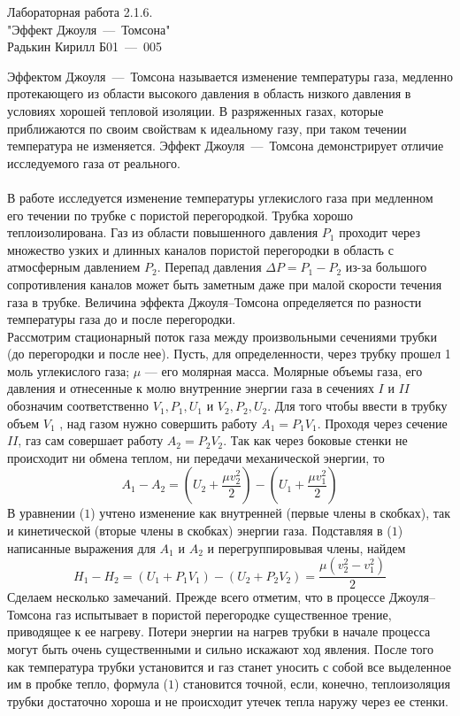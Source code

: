 \documentclass[12pt,a4paper]{article}
\begin{document}
    \begin{center}
        Лабораторная работа 2.1.6.
        \\
        "Эффект Джоуля~---~Томсона"
        \\
        Радькин Кирилл Б01~---~005
    \end{center}
    Эффектом Джоуля~---~Томсона называется изменение температуры газа, медленно протекающего из области высокого давления в область низкого давления в условиях хорошей тепловой изоляции. В разряженных газах, которые приближаются по своим свойствам к идеальному газу, при таком течении температура не изменяется. Эффект Джоуля~---~Томсона демонстрирует отличие исследуемого газа от реального.\\\\
    В работе исследуется изменение температуры углекислого газа при медленном его течении по трубке с пористой перегородкой. Трубка хорошо теплоизолирована. Газ из области повышенного давления $P_1$ проходит через множество узких и длинных каналов пористой перегородки в область с атмосферным давлением $P_2$. Перепад давления $\Delta P = P_1 - P_2$ из-за большого сопротивления каналов может быть заметным даже при малой скорости течения газа в трубке. Величина эффекта Джоуля–Томсона определяется по разности температуры газа до и после перегородки. \\
    
    Рассмотрим стационарный поток газа между произвольными сечениями трубки (до перегородки и после нее). Пусть, для определенности, через трубку прошел 1 моль углекислого газа; $\mu$ — его молярная масса. Молярные объемы газа, его давления и отнесенные к молю внутренние энергии газа в сечениях $I$ и $II$ обозначим соответственно $V_1 , P_1 , U_1$ и $V_2 , P_2 , U_2$. Для того чтобы ввести в трубку объем $V_1$ , над газом нужно совершить работу $A_1 = P_1 V_1$. Проходя через сечение $II$, газ сам совершает работу $A_2 = P_2V_2$. Так как через боковые стенки не происходит ни обмена теплом, ни передачи механической энергии, то
    \begin{equation}
    	A_1 - A_2 = \left( U_2 + \dfrac{\mu v_2^2}{2}\right) - \left( U_1 + \dfrac{\mu v_1^2}{2} \right)
	\end{equation} 
    В уравнении ($1$) учтено изменение как внутренней (первые члены в скобках), так и кинетической (вторые члены в скобках) энергии газа. Подставляя в ($1$) написанные выражения для $A_1$ и $A_2$ и перегруппировывая члены, найдем
    \begin{equation}
    H_1 - H_2 = \left( U_1 + P_1V_1 \right) - \left( U_2 + P_2V_2 \right) = \dfrac{\mu \left( v_2^2 - v_1^2 \right)}{2}
    \end{equation}
    Сделаем несколько замечаний. Прежде всего отметим, что в процессе Джоуля–Томсона газ испытывает в пористой перегородке существенное трение, приводящее к ее нагреву. Потери энергии на нагрев трубки в начале процесса могут быть очень существенными и сильно
искажают ход явления. После того как температура трубки установится и газ станет уносить с собой все выделенное им в пробке тепло, формула ($1$) становится точной, если, конечно, теплоизоляция трубки достаточно хороша и не происходит утечек тепла наружу через ее
стенки.\\
\end{document}
